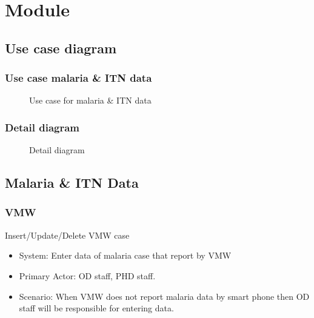 \documentclass[letterpaper,10pt,english,openany,oneside]{sphinxmanual}
\begin{document}
\chapter{Module}
\label{\detokenize{module/module:module}}\label{\detokenize{module/module::doc}}

\section{Use case diagram}
\label{\detokenize{module/module:use-case-diagram}}

\subsection{Use case malaria \& ITN data}
\label{\detokenize{module/module:use-case-malaria-itn-data}}
\begin{figure}[htbp]
\centering
\capstart

\noindent{}
\caption{Use case for malaria \& ITN data}\label{\detokenize{module/module:id1}}\end{figure}


\subsection{Detail diagram}
\label{\detokenize{module/module:detail-diagram}}
\begin{figure}[htbp]
\centering
\capstart

\noindent{}
\caption{Detail diagram}\label{\detokenize{module/module:id2}}\end{figure}


\section{Malaria \& ITN Data}
\label{\detokenize{module/module:malaria-itn-data}}

\subsection{VMW}
\label{\detokenize{module/module:vmw}}
\sphinxAtStartPar
Insert/Update/Delete VMW case
\begin{itemize}
\item {} 
\sphinxAtStartPar
System: Enter data of malaria case that report by VMW

\item {} 
\sphinxAtStartPar
Primary Actor: OD staff, PHD staff.

\item {} 
\sphinxAtStartPar
Scenario: When VMW does not report malaria data by smart phone then OD staff will be responsible for entering data.

\end{itemize}
\end{document}

